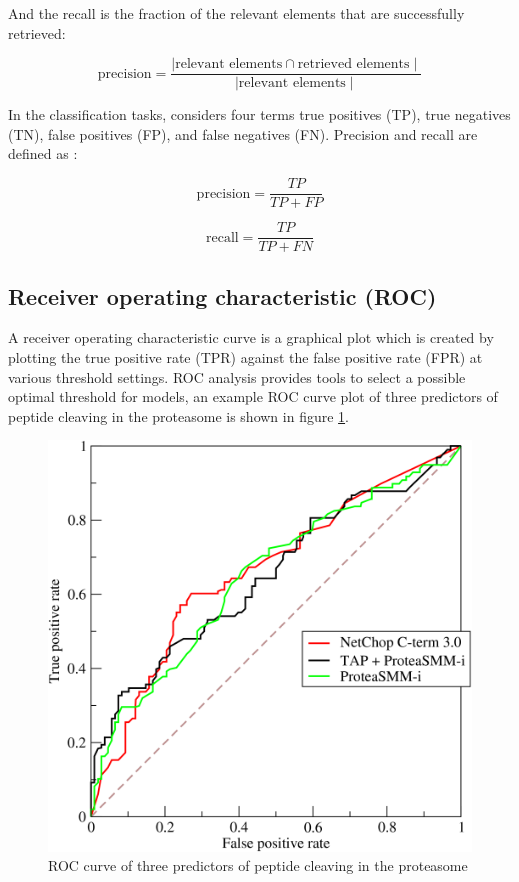 And the recall is the fraction of the relevant elements that are successfully retrieved:


\begin{equation}
\text{precision} = \dfrac{ \mid {\text{relevant elements}} \cap {\text{retrieved elements}} \mid }{ \mid {\text{relevant elements}} \mid }
\end{equation}


In the classification tasks, considers four terms true positives (TP), true negatives (TN), false positives (FP), and false negatives (FN). Precision and recall are defined as \citep{olson2008advanced}:


\begin{equation}
\text{precision} = \dfrac{ TP }{ TP + FP }
\end{equation}


\begin{equation}
\text{recall} = \dfrac{ TP }{ TP + FN }
\end{equation}


\subsection*{Receiver operating characteristic (ROC)}

A receiver operating characteristic curve is a graphical plot which is created by plotting the true positive rate (TPR) against the false positive rate (FPR) at various threshold settings. ROC analysis provides tools to select a possible optimal threshold for models, an example ROC curve plot of three predictors of peptide cleaving in the proteasome is shown in figure \ref{img:roc_curve}.

\begin{figure}
\includegraphics[scale=2.5]{Images/Roccurves.png}
\centering
\caption{ROC curve of three predictors of peptide cleaving in the proteasome \citep{wiki2018roc}}
\label{img:roc_curve}
\end{figure}


